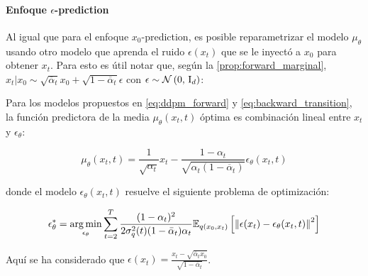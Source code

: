 \paragraph{Enfoque \texorpdfstring{$\epsilon$}{epsilon}-prediction}

Al igual que para el enfoque $x_0$-prediction, es posible reparametrizar el modelo $\mu_\theta$ usando otro modelo que aprenda el ruido $\epsilon(x_t)$ que se le inyectó a $x_0$ para obtener $x_t$. Para esto es útil notar que, según la \autoref{prop:forward_marginal}, $x_t|x_0\sim \sqrt{\overline{\alpha}_t}x_0 + \sqrt{1-\overline{\alpha}_t}\epsilon$ con $\epsilon\sim\mathcal{N}\left(0,\,\operatorname{I}_{d}\right)$:

\begin{prop}
    \label{prop:epsilon_prediction}

    Para los modelos propuestos en \eqref{eq:ddpm_forward} y \eqref{eq:backward_transition}, la función predictora de la media $\mu_\theta(x_t,t)$ óptima es combinación lineal entre $x_t$ y $\epsilon_\theta$:

    \begin{equation}
        \label{eq:ddpm_epsilon_prediction}
        \mu_\theta(x_t,t) = \frac{1}{\sqrt{\alpha_t}}x_t - \frac{1-\alpha_t}{\sqrt{\alpha_t(1-\overline{\alpha}_t)}}\epsilon_\theta(x_t,t)
    \end{equation}

    donde el modelo $\epsilon_\theta(x_t,t)$ resuelve el siguiente problema de optimización:

    \begin{equation}
        \epsilon_\theta^*=\operatorname*{arg\,min}_{\epsilon_\theta} \sum_{t=2}^T \frac{(1-\alpha_t)^2}{2\sigma_q^2(t)(1-\bar\alpha_t)\alpha_t} \mathbb{E}_{q(x_0,x_t)}\left[ \left\lVert \epsilon(x_t) - \epsilon_\theta(x_t,t) \right\rVert^2\right]
    \end{equation}

    Aquí se ha considerado que $\epsilon(x_t) = \frac{x_t-\sqrt{\overline{\alpha}_t x_0}}{\sqrt{1-\overline{\alpha}_t}}$.
\end{prop}

